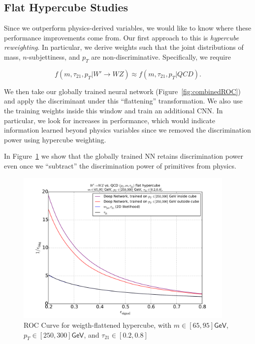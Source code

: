 
\subsection{Flat Hypercube Studies} %
\label{sub:flat_hypercube_studies}

Since we outperform physics-derived variables, we would like to know where these performance improvements come from. Our first approach to this is \emph{hypercube reweighting}. In particular, we derive weights such that the joint distributions of mass, $n$-subjettiness, and $p_T$ are non-discriminative. Specifically, we require

\begin{equation}
  f(m, \tau_{21}, p_T| W'\rightarrow WZ) \approx f(m, \tau_{21}, p_T| QCD).
\end{equation}

We then take our globally trained neural network (Figure~\ref{fig:combinedROC}) and apply the discriminant under this ``flattening'' transformation. We also use the training weights inside this window and train an additional CNN. In particular, we look for increases in performance, which would indicate information learned beyond physics variables since we removed the discrimination power using hypercube weighting.

In Figure~\ref{fig:rocCube} we show that the globally trained NN retains discrimination power even once we ``subtract'' the discrimination power of primitives from physics.

\begin{figure}[htbp]
  \centering
  \includegraphics[width=0.95\textwidth]{figures/roc-cube-inside.pdf}
  \caption{ROC Curve for weigth-flattened hypercube, with $m\in[65, 95]\mathsf{GeV}$,  $p_T\in[250, 300]\mathsf{GeV}$, and  $\tau_{21}\in[0.2, 0.8]$}
  \label{fig:rocCube}
\end{figure}

